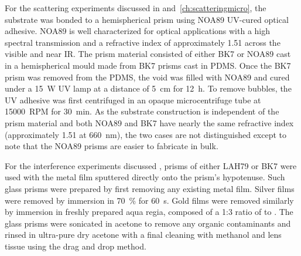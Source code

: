 For the scattering experiments discussed in 
and~\ref{ch:scatteringmicro}, the substrate was bonded to a hemispherical prism
using NOA89 UV-cured optical adhesive.  NOA89 is well characterized for optical
applications with a high spectral transmission and a refractive index of
approximately 1.51 across the visible and near IR\@.  The prism material
consisted of either BK7 or NOA89 cast in a hemispherical mould made from BK7
prisms cast in PDMS\@.  Once the BK7 prism was removed from the PDMS, the void
was filled with NOA89 and cured under a \SI{15}{\watt} UV lamp at a distance of
\SI{5}{\centi\meter} for \SI{12}{\hour}.  To remove bubbles, the UV adhesive
was first centrifuged in an opaque microcentrifuge tube at \SI{15000}{RPM} for
\SI{30}{\minute}.  As the substrate construction is independent of the prism
material and both NOA89 and BK7 have nearly the same refractive index
(approximately 1.51 at \SI{660}{\nano\meter}), the two cases are not
distinguished except to note that the NOA89 prisms are easier to fabricate in
bulk.

For the interference experiments discussed , prisms of
either LAH79 or BK7 were used with the metal film sputtered directly onto the
prism's hypotenuse.  Such glass prisms were prepared by first removing any
existing metal film.  Silver films were removed by immersion in
\SI{70}{\percent}  for \SI{60}{\second}.  Gold films were removed
similarly by immersion in freshly prepared aqua regia, composed of a 1:3 ratio
of  to .  The glass prisms were sonicated in acetone to remove
any organic contaminants and rinsed in ultra-pure dry acetone with a final cleaning with methanol and lens tissue using the drag and drop method.
